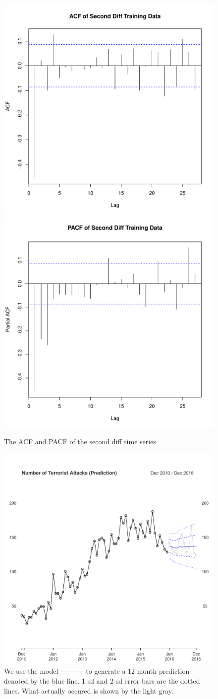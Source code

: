 \documentclass{paper}
\begin{document}
\begin{figure}
\centering
\includegraphics[width=0.45\linewidth]{../image/acf_second_diff.pdf}
\includegraphics[width=0.45\linewidth]{../image/pacf_second_diff.pdf}
\caption{The ACF and PACF of the second diff time series}
\label{second_acf_pacf}
\end{figure}

\begin{figure}
\centering
\includegraphics[width=0.75\linewidth]{../image/prediction_on_testing.pdf}
\caption{We use the model ---------- to generate a 12 month prediction denoted by the blue line. 1 sd and 2 sd error bars are the dotted lines. What actually occured is shown by the light gray.}
\label{prediction}
\end{figure}
\end{document}
